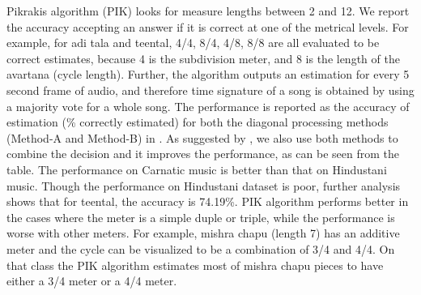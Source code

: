 Pikrakis algorithm (\acrshort{PIK}) looks for measure lengths between 2 and 12. We report the accuracy accepting an answer if it is correct at one of the metrical levels. For example, for \gls{adi} \gls{tala} and \gls{teental}, 4/4, 8/4, 4/8, 8/8 are all evaluated to be correct estimates, because 4 is the subdivision meter, and 8 is the length of the \gls{avartana} (cycle length). Further, the algorithm outputs an estimation for every 5 second frame of audio, and therefore time signature of a song is obtained by using a majority vote for a whole song. The performance is reported as the accuracy of estimation (\% correctly estimated) for both the diagonal processing methods (Method-A and Method-B) in . As suggested by \citeauthor{pikrakis:04:meter}, we also use both methods to combine the decision and it improves the performance, as can be seen from the table. The performance on Carnatic music is better than that on Hindustani music. Though the performance on Hindustani dataset is poor, further analysis shows that for \gls{teental}, the accuracy is 74.19\%. \acrshort{PIK} algorithm performs better in the cases where the meter is a simple duple or triple, while the performance is worse with other meters. For example, \gls{mishra chapu} (length 7) has an additive meter and the cycle can be visualized to be a combination of 3/4 and 4/4. On that class the \acrshort{PIK} algorithm estimates most of \gls{mishra chapu} pieces to have either a 3/4 meter or a 4/4 meter. 

